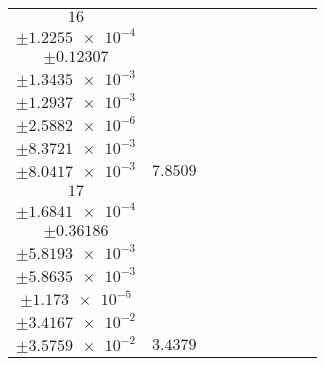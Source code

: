 \documentclass[8pt]{article}
\begin{document}
\begin{longtable}[l]{c c c c c c c c c}
$\num{16}$ & \begin{tabular}[c]{@{}c@{}}$\num{5.7059e-2}$ \\ $\pm\num{1.2255e-4}$\end{tabular} & \begin{tabular}[c]{@{}c@{}}$\num{-1.6804}$ \\ $\pm\num{0.12307}$\end{tabular} & \begin{tabular}[c]{@{}c@{}}$\num{7.0346}$ \\ $\pm\num{1.3435e-3}$\end{tabular} & \begin{tabular}[c]{@{}c@{}}$\num{1.6163e+3}$ \\ $\pm\num{1.2937e-3}$\end{tabular} & \begin{tabular}[c]{@{}c@{}}$\num{3.2335}$ \\ $\pm\num{2.5882e-6}$\end{tabular} & \begin{tabular}[c]{@{}c@{}}$\num{3.4217}$ \\ $\pm\num{8.3721e-3}$\end{tabular} & \begin{tabular}[c]{@{}c@{}}$\num{3.2829}$ \\ $\pm\num{8.0417e-3}$\end{tabular} & $\num{7.8509}$\\
$\num{17}$ & \begin{tabular}[c]{@{}c@{}}$\num{2.7991e-2}$ \\ $\pm\num{1.6841e-4}$\end{tabular} & \begin{tabular}[c]{@{}c@{}}$\num{-0.34972}$ \\ $\pm\num{0.36186}$\end{tabular} & \begin{tabular}[c]{@{}c@{}}$\num{11.281}$ \\ $\pm\num{5.8193e-3}$\end{tabular} & \begin{tabular}[c]{@{}c@{}}$\num{1.6205e+3}$ \\ $\pm\num{5.8635e-3}$\end{tabular} & \begin{tabular}[c]{@{}c@{}}$\num{3.242}$ \\ $\pm\num{1.173e-5}$\end{tabular} & \begin{tabular}[c]{@{}c@{}}$\num{4.8924}$ \\ $\pm\num{3.4167e-2}$\end{tabular} & \begin{tabular}[c]{@{}c@{}}$\num{5.0211}$ \\ $\pm\num{3.5759e-2}$\end{tabular} & $\num{3.4379}$\\
\bottomrule
\end{longtable}
\end{document}
